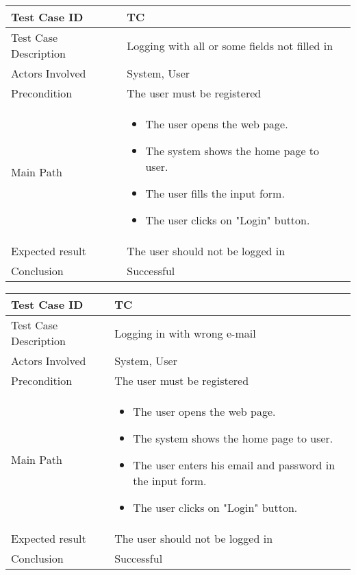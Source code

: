 \par
\begin{center} \begin{tabular}{|l|l|}
  \hline
  Test Case ID & TC \z\\
  \hline
  Test Case Description & Logging with all or some fields not filled in\\
  \hline
  Actors Involved & System, User\\
   \hline
  Precondition & The user must be registered\\
  \hline
  Main Path &   \begin{minipage}{5in}
    \vskip 4pt
            \begin{itemize}
              \item The user opens the web page.
              \item The system shows the home page to user.
              \item The user fills the input form.
              \item The user clicks on "Login" button.
            \end{itemize}
    \vskip 4pt
  \end{minipage}  \\
  \hline
  Expected result & The user should not be logged in\\
  \hline
  Conclusion & Successful\\
  \hline
\end{tabular} \end{center}

\begin{center} \begin{tabular}{|l|l|}
  \hline
  Test Case ID & TC \z\\
  \hline
  Test Case Description & Logging in with wrong e-mail\\
  \hline
  Actors Involved & System, User\\
   \hline
  Precondition & The user must be registered\\
  \hline
  Main Path &   \begin{minipage}{5in}
    \vskip 4pt
            \begin{itemize}
              \item The user opens the web page.
              \item The system shows the home page to user.
              \item The user enters his email and password in the input form.
              \item The user clicks on "Login" button.
            \end{itemize}
    \vskip 4pt
  \end{minipage}  \\
  \hline
  Expected result & The user should not be logged in\\
  \hline
  Conclusion & Successful\\
  \hline
\end{tabular} \end{center}

